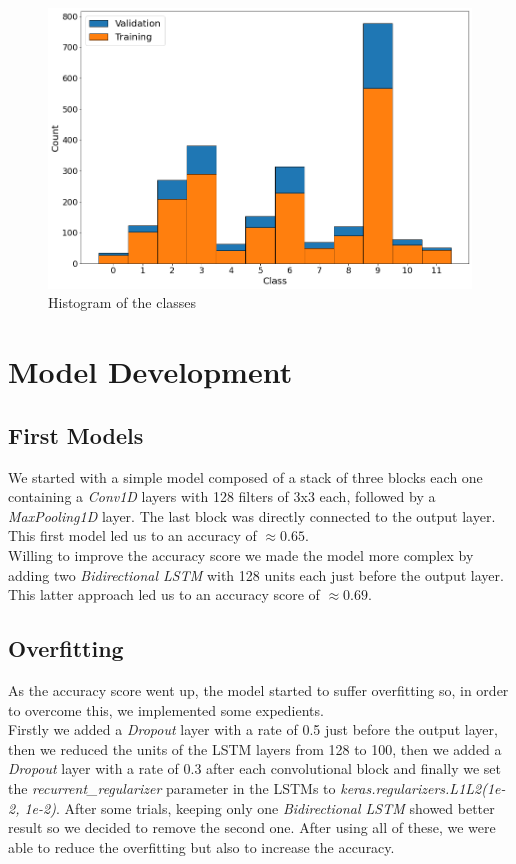 \documentclass[11pt]{article}
\begin{document}
\begin{figure}[H]
\center
	\includegraphics[scale=0.4]{class_histogram.png}
	\caption{Histogram of the classes}
\end{figure}


\section*{Model Development}
\subsection*{First Models}
We started with a simple model composed of a stack of three blocks each one containing a \emph{Conv1D} layers with 128 filters of 3x3 each, followed by a \emph{MaxPooling1D} layer. The last block was directly connected to the output layer. This first model led us to an accuracy of $\approx 0.65$.\\
Willing to improve the accuracy score we made the model more complex by adding two \emph{Bidirectional LSTM} with 128 units each just before the output layer. This latter approach led us to an accuracy score of $\approx0.69$. 
\subsection*{Overfitting}
As the accuracy score went up, the model started to suffer overfitting so, in order to overcome this, we implemented some expedients.\\
Firstly we added a \emph{Dropout} layer with a rate of 0.5 just before the output layer, then we reduced the units of the LSTM layers from 128 to 100, then we added a \emph{Dropout} layer with a rate of 0.3 after each convolutional block and finally we set the \emph{recurrent\_regularizer} parameter in the LSTMs to \emph{keras.regularizers.L1L2(1e-2, 1e-2)}. After some trials, keeping only one \emph{Bidirectional LSTM} showed better result so we decided to remove the second one. After using all of these, we were able to reduce the overfitting but also to increase the accuracy.
\end{document}
